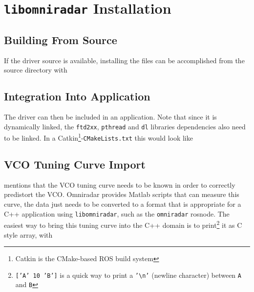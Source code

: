\chapter{\texttt{libomniradar} Installation} \label{install}

\section{Building From Source}
If the driver source is available, installing the files can be
accomplished from the source directory with

\begin{Shaded}
\begin{Highlighting}[]
\KeywordTok{\&\&} 
\end{Highlighting}
\end{Shaded}


\section{Integration Into Application}
The driver can then be included in an application. Note that since it is
dynamically linked, the \texttt{ftd2xx}, \texttt{pthread} and
\texttt{dl} libraries dependencies also need to be linked. In a Catkin\footnote{Catkin is the CMake-based ROS build system}-\texttt{CMakeLists.txt}
this would look like

\begin{Shaded}
\begin{Highlighting}[]
\NormalTok{(}
\NormalTok{)}
\end{Highlighting}
\end{Shaded}

\section{VCO Tuning Curve Import} \label{vcotune}

 mentions that the VCO tuning curve needs to be known in order to correctly predistort the VCO.
Omniradar provides Matlab scripts that can measure this curve, the data just needs to be converted to a format that is appropriate for a C++ application using \texttt{libomniradar}, such as the \texttt{omniradar} rosnode.
The easiest way to bring this tuning curve into the C++ domain is to
print\footnote{\texttt{['A' 10 'B']} is a quick way to print a \texttt{'{\textbackslash}n'} (newline character) between \texttt{A} and \texttt{B}}
it as C style array, with


